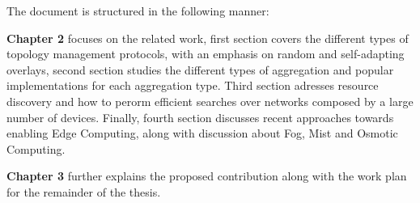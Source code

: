 The document is structured in the following manner:

\textbf{Chapter 2} focuses on the related work, first section covers the different types of topology management protocols,
with an emphasis on random and self-adapting overlays, second section studies the 
different types of aggregation and  popular implementations for each aggregation 
type. Third section adresses resource discovery and how to perorm efficient 
searches over networks composed by a large number of devices. Finally, 
fourth section discusses recent approaches towards enabling Edge Computing,
along with discussion about Fog, Mist and Osmotic Computing.

\textbf{Chapter 3} further explains the proposed contribution along with the work plan for the remainder of the thesis. 


